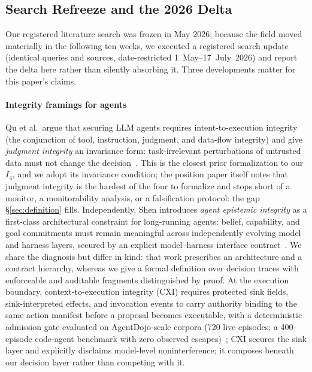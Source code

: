 \documentclass[conference]{IEEEtran}
\newcommand{\Ifour}{\ensuremath{I_4}}
\begin{document}
\subsection{Search Refreeze and the 2026 Delta}
\label{sec:delta}
Our registered literature search was frozen in May 2026; because
the field moved materially in the following ten weeks, we executed
a registered search update (identical queries and sources,
date-restricted 1~May--17~July~2026) and report the delta here
rather than silently absorbing it. Three developments matter for
this paper's claims.

\paragraph{Integrity framings for agents}
Qu et al.\ argue that securing LLM agents requires
intent-to-execution integrity (the conjunction of tool,
instruction, judgment, and data-flow integrity) and give
\emph{judgment integrity} an invariance form: task-irrelevant
perturbations of untrusted data must not change the
decision~\cite{qu}. This is the closest prior formalization to our
\Ifour, and we adopt its invariance condition; the position paper
itself notes that judgment integrity is the hardest of the four to
formalize and stops short of a monitor, a monitorability analysis,
or a falsification protocol: the gap \S\ref{sec:definition}
fills. Independently, Shen introduces \emph{agent epistemic
integrity} as a first-class architectural constraint for
long-running agents: belief, capability, and goal commitments must
remain meaningful across independently evolving model and harness
layers, secured by an explicit model--harness interface
contract~\cite{shen}. We share the diagnosis but differ in kind:
that work prescribes an architecture and a contract hierarchy,
whereas we give a formal definition over decision traces with
enforceable and auditable fragments distinguished by proof. At the
execution boundary, context-to-execution integrity (CXI) requires
protected sink fields, sink-interpreted effects, and invocation
events to carry authority binding to the same action manifest
before a proposal becomes executable, with a deterministic
admission gate evaluated on AgentDojo-scale corpora (720 live
episodes; a 400-episode code-agent benchmark with zero observed
escapes)~\cite{cxi}; CXI secures the sink layer and explicitly
disclaims model-level noninterference; it composes beneath our
decision layer rather than competing with it.
\end{document}
